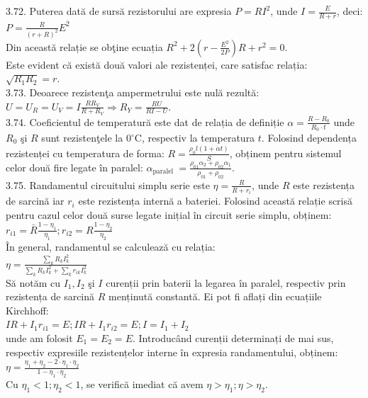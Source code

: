 3.72. Puterea dată de sursă rezistorului are expresia $P=R I^{2}$, unde $I=\frac{E}{R+r}$, deci:\\ $P=\frac{R}{(r+R)^{2}} E^{\overline{2}}$\\ Din această relație se obţine ecuația $R^{2}+2\left(r-\frac{E^{2}}{2 P}\right) R+r^{2}=0$.\\ Este evident că există două valori ale rezistenței, care satisfac relația:\\ $\sqrt{R_{1} R_{2}}=r$.\\

3.73. Deoarece rezistenţa ampermetrului este nulă rezultă:\\ $U=U_{R}=U_{V}=I \frac{R R_{V}}{R+R_{V}} \Rightarrow R_{Y}=\frac{R U}{R I-U}$.\\

3.74. Coeficientul de temperatură este dat de relația de definiție $\alpha=\frac{R-R_{0}}{R_{0} \cdot t}$ unde $R_{0}$ şi $R$ sunt rezistenţele la $0^{\circ} \mathrm{C}$, respectiv la temperatura $t$. Folosind dependența rezistenței cu temperatura de forma: $R=\frac{\rho_{0} l(1+\alpha t)}{S}$, obținem pentru sistemul celor două fire legate în paralel: $\alpha_{\text {paralel }}=\frac{\rho_{01} \alpha_{2}+\rho_{02} \alpha_{1}}{\rho_{01}+\rho_{02}}$.\\

3.75. Randamentul circuitului simplu serie este $\eta=\frac{R}{R+r_{i}}$, unde $R$ este rezistența de sarcină iar $r_{i}$ este rezistența internă a bateriei. Folosind această relație scrisă pentru cazul celor două surse legate inițial în circuit serie simplu, obținem:\\ $r_{i 1}=\bar{R} \frac{1-\eta_{1}}{\eta_{1}} ; r_{i 2}=R \frac{1-\eta_{2}}{\eta_{2}}$\\ În general, randamentul se calculează cu relația:\\ $\eta=\frac{\sum_{k} R_{k} I_{k}^{2}}{\sum_{k} R_{k} I_{k}^{2}+\sum_{k} r_{i k} I_{k}^{2}}$\\ Să notăm cu $I_{1}, I_{2}$ şi $I$ curenții prin baterii la legarea în paralel, respectiv prin rezistența de sarcină $R$ menținută constantă. Ei pot fi aflați din ecuațiile Kirchhoff:\\ $I R+I_{1} r_{i 1}=E ; I R+I_{1} r_{i 2}=E ; I=I_{1}+I_{2}$\\ unde am folosit $E_{1}=E_{2}=E$. Introducând curenții determinați de mai sus, respectiv expresiile rezistențelor interne în expresia randamentului, obținem:\\ $\eta=\frac{\eta_{1}+\eta_{2}-2 \cdot \eta_{1} \cdot \eta_{2}}{1-\eta_{1} \cdot \eta_{2}}$\\ Cu $\eta_{1}<1 ; \eta_{2}<1$, se verifică imediat că avem $\eta>\eta_{1} ; \eta>\eta_{2}$.\\

